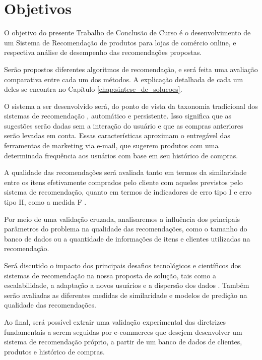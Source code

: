 \chapter[Objetivos]{Objetivos}
\label{chap:objetivos}

O objetivo do presente Trabalho de Conclusão de Curso é o desenvolvimento de um Sistema de Recomendação de produtos para lojas de comércio online, e respectiva análise de desempenho das recomendações propostas. 

Serão propostos diferentes algoritmos de recomendação, e será feita uma avaliação comparativa entre cada um dos métodos. A explicação detalhada de cada um deles se encontra no Capítulo \ref{chap:sintese_de_solucoes}.

O sistema a ser desenvolvido será, do ponto de vista da taxonomia tradicional dos sistemas de recomendação \cite{schafer1999recommender}, automático e persistente. Isso significa que as sugestões serão dadas sem a interação do usuário e que as compras anteriores serão levadas em conta. Essas características aproximam o entregável das ferramentas de marketing via e-mail, que sugerem produtos com uma determinada frequência aos usuários com base em seu histórico de compras. 

A qualidade das recomendações será avaliada tanto em termos da similaridade entre os itens efetivamente comprados pelo cliente com aqueles previstos pelo sistema de recomendação, quanto em termos de indicadores de erro tipo I e erro tipo II, como a medida F \cite{sarwar2000analysis}. 

Por meio de uma validação cruzada, analisaremos a influência dos principais parâmetros do problema na qualidade das recomendações, como o tamanho do banco de dados ou a quantidade de informações de itens e clientes utilizadas na recomendação. 

Será discutido o impacto dos principais desafios tecnológicos e científicos dos sistemas de recomendação na nossa proposta de solução, tais como a escalabilidade, a adaptação a novos usuários e a dispersão dos dados \cite{wei2007survey}. Também serão avaliadas as diferentes medidas de similaridade e modelos de predição na qualidade das recomendações. 

Ao final, será possível extrair uma validação experimental das diretrizes fundamentais a serem seguidas por e-commerces que desejem desenvolver um sistema de recomendação próprio, a partir de um banco de dados de clientes, produtos e histórico de compras. 